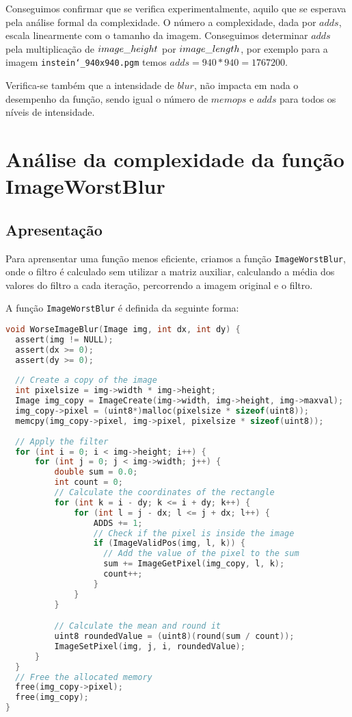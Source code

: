 \documentclass{report}
\begin{document}
Conseguimos confirmar que se verifica experimentalmente, aquilo que se esperava pela análise formal da complexidade. O número a complexidade, dada por \(adds\), escala linearmente com o tamanho da imagem. Conseguimos determinar \(adds\) pela multiplicação de \(image\char`_height\) por \(image\char`_length\), por exemplo para a imagem \texttt{instein\char`_940x940.pgm} temos \texttt{$adds = 940*940 = 1767200$}.
\par
Verifica-se também que a intensidade de \(blur\), não impacta em nada o desempenho da função, sendo igual o número de \(memops\) e \(adds\) para todos os níveis de intensidade.


\section{Análise da complexidade da função ImageWorstBlur}

\subsection{Apresentação}
Para aprensentar uma função menos eficiente, criamos a função \texttt{ImageWorstBlur}, onde o filtro é calculado sem utilizar a matriz auxiliar,
calculando a média dos valores do filtro a cada iteração, percorrendo a imagem original e o filtro.
\par
A função \texttt{ImageWorstBlur} é definida da seguinte forma:

\begingroup
\begin{lstlisting}[language=C]
void WorseImageBlur(Image img, int dx, int dy) {
  assert(img != NULL);
  assert(dx >= 0);
  assert(dy >= 0);
  
  // Create a copy of the image
  int pixelsize = img->width * img->height;
  Image img_copy = ImageCreate(img->width, img->height, img->maxval);
  img_copy->pixel = (uint8*)malloc(pixelsize * sizeof(uint8));
  memcpy(img_copy->pixel, img->pixel, pixelsize * sizeof(uint8));
  
  // Apply the filter
  for (int i = 0; i < img->height; i++) {
      for (int j = 0; j < img->width; j++) {
          double sum = 0.0;
          int count = 0;
          // Calculate the coordinates of the rectangle
          for (int k = i - dy; k <= i + dy; k++) {
              for (int l = j - dx; l <= j + dx; l++) {
                  ADDS += 1;
                  // Check if the pixel is inside the image
                  if (ImageValidPos(img, l, k)) {
                    // Add the value of the pixel to the sum
                    sum += ImageGetPixel(img_copy, l, k);
                    count++;
                  }
              }
          }

          // Calculate the mean and round it
          uint8 roundedValue = (uint8)(round(sum / count));
          ImageSetPixel(img, j, i, roundedValue);
      }
  }
  // Free the allocated memory
  free(img_copy->pixel);
  free(img_copy);
}
\end{lstlisting}
\endgroup
\end{document}

